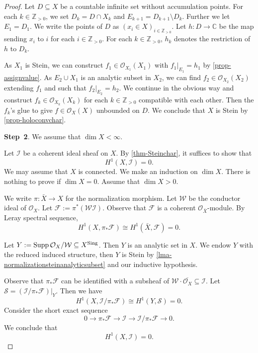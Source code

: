\begin{proof}
    Let $D\subseteq X$ be a countable infinite set without accumulation points. For each $k\in \mathbb{Z}_{>0}$, we set $D_k=D\cap X_k$ and $E_{k+1}=D_{k+1}\setminus D_k$. Further we let $E_1=D_1$. We write the points of $D$ as $(x_i\in X)_{i\in \mathbb{Z}_{>0}}$. Let $h:D\rightarrow \mathbb{C}$ be the map sending $x_i$ to $i$ for each $i\in \mathbb{Z}_{>0}$. For each $k\in \mathbb{Z}_{>0}$, $h_k$ denotes the restriction of $h$ to $D_k$.

    As $X_1$ is Stein, we can construct $f_1\in \mathcal{O}_{X_1}(X_1)$ with $f_1|_{E_1}=h_1$ by \cref{prop-assignvalue}. As $E_2\cup X_1$ is an analytic subset in $X_2$, we can find $f_2\in \mathcal{O}_{X_2}(X_2)$ extending $f_1$ and such that $f_2|_{E_2}=h_2$. We continue in the obvious way and construct $f_k\in \mathcal{O}_{X_k}(X_k)$ for each $k\in \mathbb{Z}_{>0}$ compatible with each other. Then the $f_k$'s glue to give $f\in \mathcal{O}_{X}(X)$ unbounded on $D$. We conclude that $X$ is Stein by \cref{prop-holoconvchar}.

    \textbf{Step~2}. We assume that $\dim X<\infty$.

    Let $\mathcal{I}$ be a coherent ideal sheaf on $X$. By \cref{thm-Steinchar}, it suffices to show that 
    \[
        H^1(X,\mathcal{I})=0.  
    \]
    We may assume that $X$ is connected.
    We make an induction on $\dim X$. There is nothing to prove if $\dim X=0$. Assume that $\dim X>0$.

    We write $\pi:\bar{X}\rightarrow X$ for the normalization morphism.
    Let $\mathcal{W}$ be the conductor ideal of $\mathcal{O}_X$. Let $\mathcal{F}:=\pi^*(\mathcal{W}\mathcal{I})$. Observe that $\mathcal{F}$ is a coherent $\mathcal{O}_{\bar{X}}$-module.  By Leray spectral sequence,
    \[
        H^1(X,\pi_*\mathcal{F})\cong H^1(\bar{X},\mathcal{F})=0.  
    \]
    
    Let $Y:=\operatorname{Supp} \mathcal{O}_X/\mathcal{W}\subseteq X^{\operatorname{Sing}}$. Then $Y$ is an analytic set in $X$. We endow $Y$ with the reduced induced structure, then $Y$ is Stein by \cref{lma-normalizationsteinanalyticsubset} and our inductive hypothesis. 
    
    Observe that $\pi_*\mathcal{F}$ can be identified with a subsheaf of $\mathcal{W}\cdot \overline{\mathcal{O}_X}\subseteq \mathcal{I}$.
    Let $\mathcal{S}=(\mathcal{I}/\pi_*\mathcal{F})|_Y$. Then we have
    \[
        H^1(X,\mathcal{I}/\pi_*\mathcal{F})\cong H^1(Y,\mathcal{S})=0.  
    \]
    Consider the short exact sequence
    \[
        0\rightarrow \pi_*\mathcal{F}\rightarrow \mathcal{I}\rightarrow \mathcal{I}/\pi_*\mathcal{F}  \rightarrow 0.
    \]
    We conclude that 
    \[
        H^1(X,\mathcal{I})=0.  
    \]
\end{proof}

